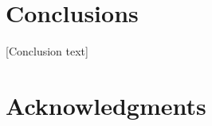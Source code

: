 \documentclass{sig-alternate}
\begin{document}
\section{Conclusions}
\label{sec:conclusions}

[Conclusion text]

\section*{Acknowledgments}
\label{sec:acknowledgments}



  
\end{document}
